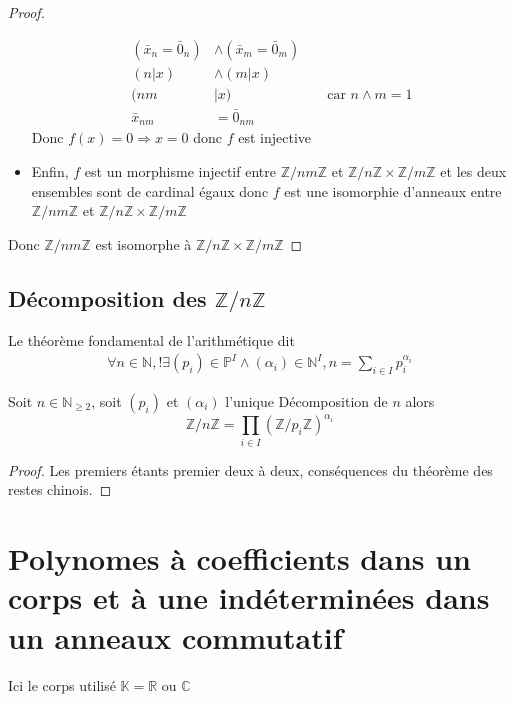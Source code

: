 \documentclass[11pt,colorlinks]{book}
\theoremstyle{mytheoremstyle}
\theoremstyle{mytheoremstyle}
\theoremstyle{mytheoremstyle}
\theoremstyle{mytheoremstyle}
\theoremstyle{mytheoremstyle}
\theoremstyle{mytheoremstyle}
\theoremstyle{mytheoremstyle}
\theoremstyle{mytheoremstyle}
\theoremstyle{myproblemstyle}
\def\mbb#1{\mathbb{#1}}
\def\bN{\mbb{N}}
\def\bC{\mbb{C}}
\def\bR{\mbb{R}}
\def\bZ{\mbb{Z}}
\def\bK{\mbb{K}}
\begin{document}
\begin{theorem}
\begin{proof}
\begin{itemize}
\begin{align*}
        (\bar{x}_n = \bar{0}_n) &\wedge (\bar{x}_m = \bar{0}_m) \\ 
        (n | x) &\wedge (m | x) \\ 
        (nm &| x) && \text{ car } n \wedge m = 1 \\ 
        \bar{x}_{nm} &= \bar{0}_{nm}
      \end{align*}
      Donc $f(x) = 0 \Rightarrow x=0$ donc $f$ est injective
      \item Enfin, $f$ est un morphisme injectif entre $\bZ/nm\bZ$ et $\bZ/n\bZ \times \bZ/m\bZ$ et les deux ensembles sont de cardinal égaux 
      donc $f$ est une isomorphie d'anneaux entre $\bZ/nm\bZ$ et $\bZ/n\bZ \times \bZ/m\bZ$
    \end{itemize}
    Donc $\bZ/nm\bZ$ est isomorphe à $\bZ/n\bZ \times \bZ/m\bZ$ 
  \end{proof}
\end{theorem}
\subsection{Décomposition des $\bZ/n\bZ$}
\begin{definition}
  Le théorème fondamental de l'arithmétique dit 
  \begin{align*}
    \forall n \in \bN, !\exists (p_i) \in \mathbb{P}^{I} \wedge (\alpha_i) \in \bN^{I}, n = \sum_{i\in I} p_i^{\alpha_i}
  \end{align*}
\end{definition}
\begin{theorem}
  Soit $n \in \bN_{\geq 2}$, soit $(p_i)$ et $(\alpha_i)$ l'unique Décomposition de $n$ alors 
  \begin{equation*}
    \bZ/n\bZ = \prod_{i\in I} (\bZ/p_i\bZ)^{\alpha_i}
  \end{equation*}
  \begin{proof}
    Les premiers étants premier deux à deux, conséquences du théorème des restes chinois.
  \end{proof}
\end{theorem}
\section{Polynomes à coefficients dans un corps et à une indéterminées dans un anneaux commutatif}
\begin{rmq}
  Ici le corps utilisé $\bK = \bR$ ou $\bC$
\end{rmq}
\end{document}
